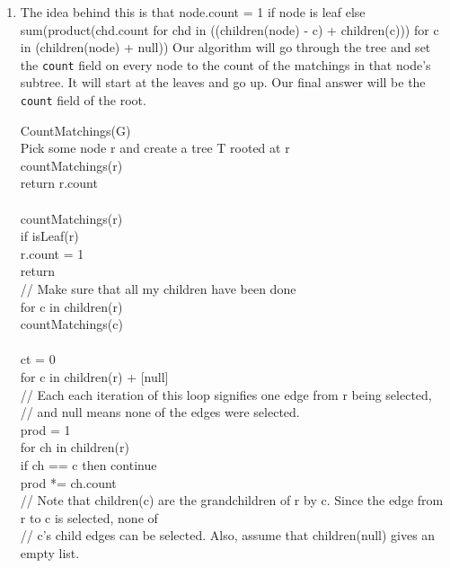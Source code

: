 \documentclass[11pt]{article}
\begin{document}
\begin{solution}
    \begin{enumerate}
        \item The idea behind this is that node.count = 1 if node is leaf else sum(product(chd.count for chd in ((children(node) - {c}) + children(c))) for c in (children(node) + null))
            Our algorithm will go through the tree and set the \texttt{count} field on every node to the count of the matchings in that node's subtree. It will start at the leaves and go up. Our final answer will be the \texttt{count} field of the root.
            \begin{algo}
                CountMatchings(G) \+
                \\ Pick some node r and create a tree T rooted at r
                \\ countMatchings(r)
                \\ return r.count \-
                \\ 
                \\ countMatchings(r) \+
                \\ if isLeaf(r) \+
                \\ r.count = 1
                \\ return \-
                \\ // Make sure that all my children have been done
                \\ for c in children(r) \+
                \\ countMatchings(c) \-
                \\ 
                \\ ct = 0
                \\ for c in children(r) + [null] \+
                \\ // Each each iteration of this loop signifies one edge from r being selected, 
                \\ // and null means none of the edges were selected.
                \\ prod = 1 
                \\ for ch in children(r) \+
                \\ if ch == c then continue
                \\ prod *= ch.count \-
                \\ // Note that children(c) are the grandchildren of r by c. Since the edge from r to c is selected, none of
                \\ // c's child edges can be selected. Also, assume that children(null) gives an empty list.

\end{algo}
\end{enumerate}
\end{solution}
\end{document}
